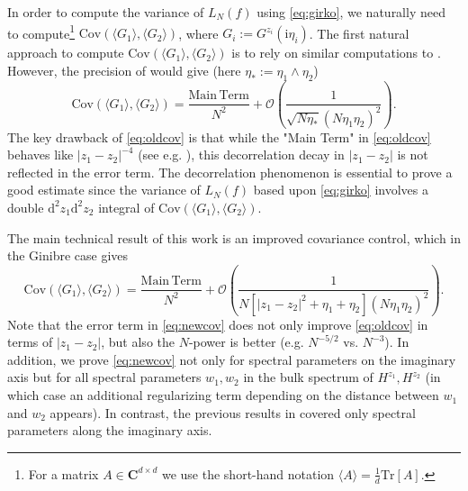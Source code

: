 \documentclass[10pt]{amsart}
\numberwithin{equation}{section}
\newcommand{\dif}{\mathrm{d}}
\newcommand{\C}{\mathbf{C}}
\newcommand{\ii}{\mathrm{i}}
\begin{document}
In order to compute the variance of $L_N(f)$ using \eqref{eq:girko}, we naturally need to compute\footnote{For a matrix $A\in\C^{d\times d}$ we use the short-hand notation $\langle A \rangle=\frac{1}{d}\mathrm{Tr}[A]$.} $\mathrm{Cov}(\langle G_1\rangle, \langle G_2\rangle)$, where $G_i:=G^{z_i}(\ii\eta_i)$. The first natural approach to compute $\mathrm{Cov}(\langle G_1\rangle, \langle G_2\rangle)$ is to rely on similar computations to \cite[Section 6]{macroCLT_complex}. However, the precision of \cite[Eq. (6.31)]{macroCLT_complex} would give (here $\eta_*:=\eta_1\wedge\eta_2$)
\begin{equation}
\label{eq:oldcov}
\mathrm{Cov}(\langle G_1\rangle, \langle G_2\rangle)=\frac{\mathrm{Main \, Term}}{N^2}+\mathcal{O}\left(\frac{1}{\sqrt{N\eta_*}(N\eta_1\eta_2)^2}\right).
\end{equation}
The key drawback of \eqref{eq:oldcov} is that while the "Main Term" in \eqref{eq:oldcov} behaves like $|z_1-z_2|^{-4}$ (see e.g. \cite[Eq. (4.24)]{macroCLT_complex}), this decorrelation
decay in $|z_1-z_2|$ is not reflected in the error term. 
The decorrelation phenomenon is essential to prove a good estimate since the variance of $L_N(f)$
based upon \eqref{eq:girko} involves a double $\dif^2 z_1\dif^2 z_2$ integral of 
$\mathrm{Cov}(\langle G_1\rangle, \langle G_2\rangle)$.


The main technical result of this work is an improved covariance control, which in the Ginibre case gives
\begin{equation}
\label{eq:newcov}
\mathrm{Cov}(\langle G_1\rangle, \langle G_2\rangle)=\frac{\mathrm{Main \, Term}}{N^2}+\mathcal{O}\left(\frac{1}{N[|z_1-z_2|^2+\eta_1+\eta_2](N\eta_1\eta_2)^2}\right).
\end{equation}
Note that the error term in \eqref{eq:newcov} does not only improve \eqref{eq:oldcov} in terms of $|z_1-z_2|$, but also the $N$-power is better (e.g. $N^{-5/2}$ vs. $N^{-3}$). In addition, we prove \eqref{eq:newcov} not only for spectral parameters on the imaginary axis but for all spectral parameters $w_1, w_2$ in the bulk spectrum
of $H^{z_1}, H^{z_2}$ (in which case an additional regularizing term depending on the distance between $w_1$ and $w_2$ appears). In contrast, the previous results in \cite{macroCLT_complex} covered only spectral parameters along the imaginary axis. 
\end{document}
